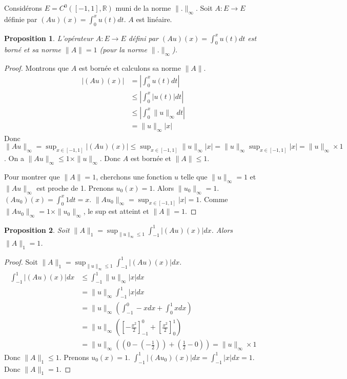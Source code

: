 \documentclass{article}
\newtheorem{proposition}{Proposition} %
\theoremstyle{definition} %
\begin{document}
Considérons $E = C^0([-1,1], \mathbb{R})$ muni de la norme $\|.\|_\infty$.
Soit $A: E \to E$ définie par $(Au)(x) = \int_0^x u(t) dt$. $A$ est linéaire.

\begin{proposition}
L'opérateur $A: E \to E$ défini par $(Au)(x) = \int_0^x u(t) dt$ est borné et sa norme $\|A\| = 1$ (pour la norme $\|.\|_\infty$).
\end{proposition}
\begin{proof}
Montrons que $A$ est bornée et calculons sa norme $\|A\|$.
\begin{align*} |(Au)(x)| &= \left| \int_0^x u(t) dt \right| \\ &\le \left| \int_0^x |u(t)| dt \right| \\ &\le \left| \int_0^x \|u\|_\infty dt \right| \\ &= \|u\|_\infty |x| \end{align*}
Donc $\|Au\|_\infty = \sup_{x \in [-1,1]} |(Au)(x)| \le \sup_{x \in [-1,1]} \|u\|_\infty |x| = \|u\|_\infty \sup_{x \in [-1,1]} |x| = \|u\|_\infty \times 1$.
On a $\|Au\|_\infty \le 1 \times \|u\|_\infty$. Donc $A$ est bornée et $\|A\| \le 1$.

Pour montrer que $\|A\| = 1$, cherchons une fonction $u$ telle que $\|u\|_\infty = 1$ et $\|Au\|_\infty$ est proche de 1.
Prenons $u_0(x) = 1$. Alors $\|u_0\|_\infty = 1$.
$(Au_0)(x) = \int_0^x 1 dt = x$.
$\|Au_0\|_\infty = \sup_{x \in [-1,1]} |x| = 1$.
Comme $\|Au_0\|_\infty = 1 \times \|u_0\|_\infty$, le sup est atteint et $\|A\| = 1$.
\end{proof}

\begin{proposition}
Soit $\|A\|_1 = \sup_{\|u\|_\infty \le 1} \int_{-1}^1 |(Au)(x)| dx$. Alors $\|A\|_1 = 1$.
\end{proposition}
\begin{proof}
Soit $\|A\|_1 = \sup_{\|u\|_\infty \le 1} \int_{-1}^1 |(Au)(x)| dx$.
\begin{align*} \int_{-1}^1 |(Au)(x)| dx &\le \int_{-1}^1 \|u\|_\infty |x| dx \\ &= \|u\|_\infty \int_{-1}^1 |x| dx \\ &= \|u\|_\infty \left( \int_{-1}^0 -x dx + \int_0^1 x dx \right) \\ &= \|u\|_\infty \left( \left[-\frac{x^2}{2}\right]_{-1}^0 + \left[\frac{x^2}{2}\right]_0^1 \right) \\ &= \|u\|_\infty \left( (0 - (-\frac{1}{2})) + (\frac{1}{2} - 0) \right) = \|u\|_\infty \times 1 \end{align*}
Donc $\|A\|_1 \le 1$.
Prenons $u_0(x) = 1$.
$\int_{-1}^1 |(Au_0)(x)| dx = \int_{-1}^1 |x| dx = 1$.
Donc $\|A\|_1 = 1$.
\end{proof}
\end{document}
